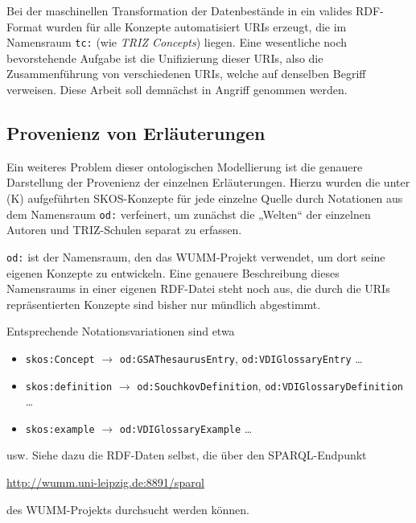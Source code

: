 \documentclass[11pt,a4paper]{article}
\begin{document}
Bei der maschinellen Transformation der Datenbestände in ein valides
RDF-Format wurden für alle Konzepte automatisiert URIs erzeugt, die im
Namensraum \texttt{tc:} (wie \emph{TRIZ Concepts}) liegen. Eine wesentliche
noch bevorstehende Aufgabe ist die Unifizierung dieser URIs, also die
Zusammenführung von verschiedenen URIs, welche auf denselben Begriff
verweisen.  Diese Arbeit soll demnächst in Angriff genommen werden.

\subsection{Provenienz von Erläuterungen}

Ein weiteres Problem dieser ontologischen Modellierung ist die genauere
Darstellung der Provenienz der einzelnen Erläuterungen. Hierzu wurden die
unter (K) aufgeführten SKOS-Konzepte für jede einzelne Quelle durch Notationen
aus dem Namensraum \texttt{od:} verfeinert, um zunächst die „Welten“ der
einzelnen Autoren und TRIZ-Schulen separat zu erfassen.

\texttt{od:} ist der Namensraum, den das WUMM-Projekt verwendet, um dort seine
eigenen Konzepte zu entwickeln.  Eine genauere Beschreibung dieses Namensraums
in einer eigenen RDF-Datei steht noch aus, die durch die URIs repräsentierten
Konzepte sind bisher nur mündlich abgestimmt.

Entsprechende Notationsvariationen sind etwa
\begin{itemize}[noitemsep]
\item \texttt{skos:Concept} $\to$ \texttt{od:GSAThesaurusEntry},
  \texttt{od:VDIGlossaryEntry} \ldots
\item \texttt{skos:definition} $\to$ \texttt{od:SouchkovDefinition},
  \texttt{od:VDIGlossaryDefinition} \ldots
\item \texttt{skos:example} $\to$ \texttt{od:VDIGlossaryExample} \ldots
\end{itemize}
usw. Siehe dazu die RDF-Daten selbst, die über den SPARQL-Endpunkt
\begin{center}
  \url{http://wumm.uni-leipzig.de:8891/sparql}
\end{center}
des WUMM-Projekts durchsucht werden können.
\end{document}
